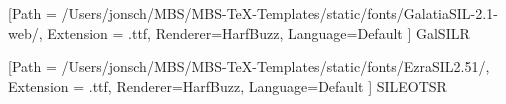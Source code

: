 \usepackage{fontspec}
\usepackage[bidi=basic]{babel}





           [Path = /Users/jonsch/MBS/MBS-TeX-Templates/static/fonts/GalatiaSIL-2.1-web/,
           Extension = .ttf,
           Renderer=HarfBuzz,
           Language=Default ]
          {GalSILR}

           [Path = /Users/jonsch/MBS/MBS-TeX-Templates/static/fonts/EzraSIL2.51/,
           Extension = .ttf,
           Renderer=HarfBuzz,
           Language=Default ]
          {SILEOTSR}
